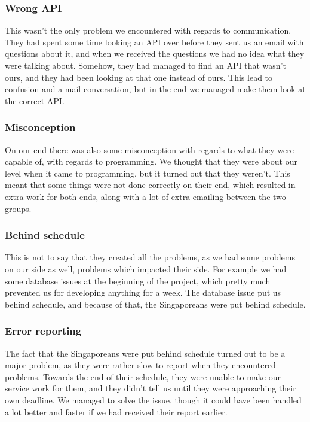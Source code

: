 \subsubsection{Wrong API}
\label{Collaboration_SMU_ConflictsAPI}
This wasn't the only problem we encountered with regards to communication. They had spent some time looking an API over before they sent us an email with questions about it, and when we received the questions we had no idea what they were talking about. Somehow, they had managed to find an API that wasn't ours, and they had been looking at that one instead of ours. This lead to confusion and a mail conversation, but in the end we managed make them look at the correct API.

\subsubsection{Misconception}
\label{Collaboration_SMU_ConflictsMisconception}
On our end there was also some misconception with regards to what they were capable of, with regards to programming. We thought that they were about our level when it came to programming, but it turned out that they weren't. This meant that some things were not done correctly on their end, which resulted in extra work for both ends, along with a lot of extra emailing between the two groups.

\subsubsection{Behind schedule}
\label{Cooperation_schedule}
This is not to say that they created all the problems, as we had some problems on our side as well, problems which impacted their side. For example we had some database issues at the beginning of the project, which pretty much prevented us for developing anything for a week. The database issue put us behind schedule, and because of that, the Singaporeans were put behind schedule.

\subsubsection{Error reporting}
\label{Cooperation_error}
The fact that the Singaporeans were put behind schedule turned out to be a major problem, as they were rather slow to report when they encountered problems. Towards the end of their schedule, they were unable to make our service work for them, and they didn't tell us until they were approaching their own deadline. We managed to solve the issue, though it could have been handled a lot better and faster if we had received their report earlier.

